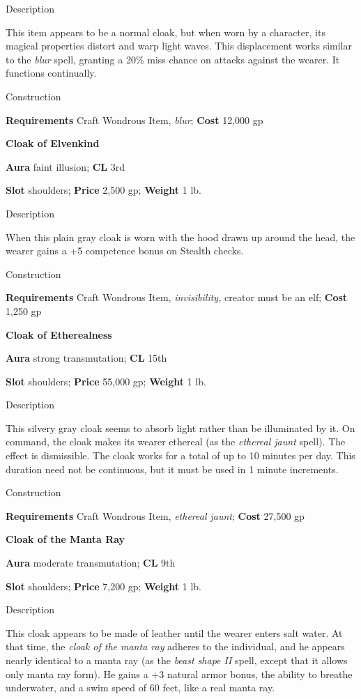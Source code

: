 Description
				
This item appears to be a normal cloak, but when worn by a character, its magical properties distort and warp light waves. This displacement works similar to the \textit{blur }spell, granting a 20\% miss chance on attacks against the wearer. It functions continually. 
				
Construction
				
\textbf{Requirements} Craft Wondrous Item, \textit{blur}; \textbf{Cost }12,000 gp
				
\textbf{Cloak of Elvenkind}
				
\textbf{Aura} faint illusion;\textbf{ CL }3rd
				
\textbf{Slot} shoulders; \textbf{Price} 2,500 gp; \textbf{Weight} 1 lb.
				
Description
				
When this plain gray cloak is worn with the hood drawn up around the head, the wearer gains a +5 competence bonus on Stealth checks. 
				
Construction
				
\textbf{Requirements} Craft Wondrous Item, \textit{invisibility,} creator must be an elf; \textbf{Cost }1,250 gp
				
\textbf{Cloak of Etherealness}
				
\textbf{Aura} strong transmutation;\textbf{ CL }15th
				
\textbf{Slot} shoulders; \textbf{Price} 55,000 gp; \textbf{Weight} 1 lb.
				
Description
				
This silvery gray cloak seems to absorb light rather than be illuminated by it. On command, the cloak makes its wearer ethereal (as the \textit{ethereal jaunt }spell). The effect is dismissible. The cloak works for a total of up to 10 minutes per day. This duration need not be continuous, but it must be used in 1 minute increments. 
				
Construction
				
\textbf{Requirements} Craft Wondrous Item, \textit{ethereal jaunt}; \textbf{Cost }27,500 gp
				
\textbf{Cloak of the Manta Ray}
				
\textbf{Aura} moderate transmutation;\textbf{ CL }9th
				
\textbf{Slot} shoulders; \textbf{Price} 7,200 gp; \textbf{Weight} 1 lb.
				
Description
				
This cloak appears to be made of leather until the wearer enters salt water. At that time, the \textit{cloak of the manta ray }adheres to the individual, and he appears nearly identical to a manta ray (as the \textit{beast shape II }spell, except that it allows only manta ray form). He gains a +3 natural armor bonus, the ability to breathe underwater, and a swim speed of 60 feet, like a real manta ray.
				
